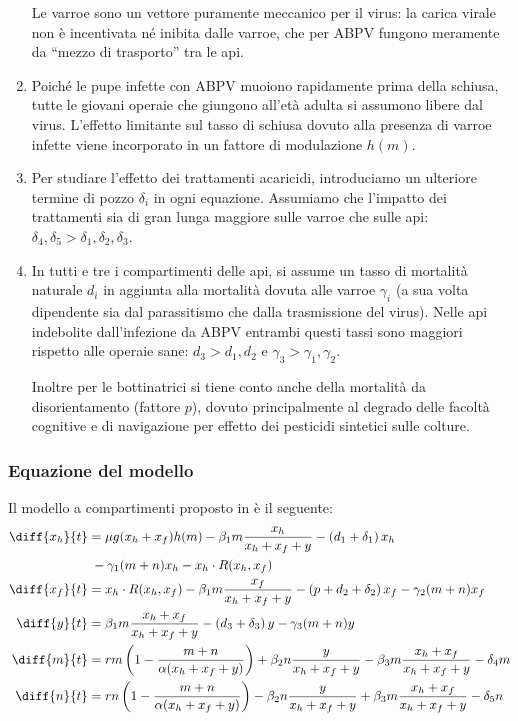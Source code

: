 \begin{enumerate}
    Le varroe sono un vettore puramente meccanico per il virus: la carica virale non è incentivata né inibita dalle varroe, che per ABPV fungono meramente da ``mezzo di trasporto'' tra le api.
    \item Poiché le pupe infette con ABPV muoiono rapidamente prima della schiusa, tutte le giovani operaie che giungono all'età adulta si assumono libere dal virus. L'effetto limitante sul tasso di schiusa dovuto alla presenza di varroe infette viene incorporato in un fattore di modulazione $h(m)$.
    \item Per studiare l'effetto dei trattamenti acaricidi, introduciamo un ulteriore termine di pozzo $\delta_i$ in ogni equazione. Assumiamo che l'impatto dei trattamenti sia di gran lunga maggiore sulle varroe che sulle api: $\delta_4, \delta_5 > \delta_1, \delta_2, \delta_3$.
    \item In tutti e tre i compartimenti delle api, si assume un tasso di mortalità naturale $d_i$ in aggiunta alla mortalità dovuta alle varroe $\gamma_i$ (a sua volta dipendente sia dal parassitismo che dalla trasmissione del virus). Nelle api indebolite dall'infezione da ABPV entrambi questi tassi sono maggiori rispetto alle operaie sane: $d_3 > d_1, d_2$ e $\gamma_3 > \gamma_1, \gamma_2$.

    Inoltre per le bottinatrici si tiene conto anche della mortalità da disorientamento (fattore $p$), dovuto principalmente al degrado delle facoltà cognitive e di navigazione per effetto dei pesticidi sintetici sulle colture.
\end{enumerate}


\subsubsection{Equazione del modello}
Il modello a compartimenti proposto in \cite{ratti2017} è il seguente:
\begin{align}
    \diff{x_h}{t} &= \mu g( x_h + x_f ) h(m) - \beta_1 m \frac{x_h}{x_h + x_f + y} - \left( d_1 + \delta_1 \right) x_h \notag \\ %
    \label{eq:r17xh}
        &{\;} - \gamma_1 (m+n) x_h - x_h \cdot R(x_h, x_f) \\ %
    \label{eq:r17xf}
    \diff{x_f}{t} &= x_h \cdot R(x_h, x_f) - \beta_1 m \frac{x_f}{x_h + x_f + y}
    - \left( p + d_2 + \delta_2 \right) x_f - \gamma_2 (m+n) x_f \\
    \label{eq:r17y}
    \diff{y}{t} &= \beta_1 m \frac{x_h + x_f}{x_h + x_f + y} - \left( d_3 + \delta_3 \right) y - \gamma_3 (m+n) y \\
    \label{eq:r17m}
    \diff{m}{t} &= rm \left( 1 - \frac{m+n}{ \alpha (x_h + x_f + y) } \right) + \beta_2 n \frac{y}{x_h + x_f + y}
    - \beta_3 m \frac{x_h + x_f}{x_h + x_f + y} - \delta_4 m \\
    \label{eq:r17n}
    \diff{n}{t} &= rn \left( 1 - \frac{m+n}{ \alpha (x_h + x_f + y) } \right) - \beta_2 n \frac{y}{x_h + x_f + y}
    + \beta_3 m \frac{x_h + x_f}{x_h + x_f + y} - \delta_5 n
\end{align}

